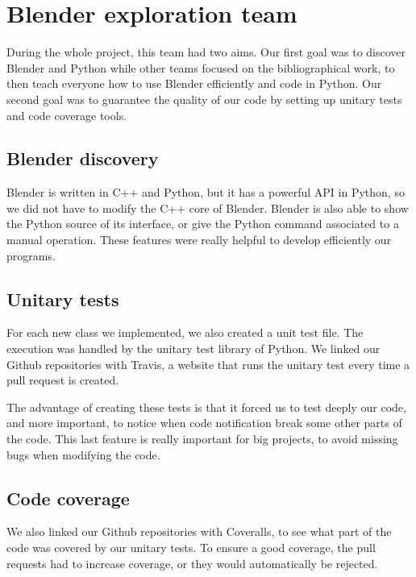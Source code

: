 \section{Blender exploration team}

During the whole project, this team had two aims. Our first goal was
to discover Blender and Python while other teams focused on the
bibliographical work, to then teach everyone how to use Blender
efficiently and code in Python. Our second goal was to guarantee the
quality of our code by setting up unitary tests and code coverage
tools.

\subsection{Blender discovery}

Blender is written in C++ and Python, but it has a powerful API in
Python, so we did not have to modify the C++ core of Blender. Blender
is also able to show the Python source of its interface, or give the
Python command associated to a manual operation. These features were
really helpful to develop efficiently our programs.


\subsection{Unitary tests}

For each new class we implemented, we also created a unit test
file. The execution was handled by the unitary test library of
Python. We linked our Github repositories with Travis, a website
that runs the unitary test every time a pull request is created.

The advantage of creating these tests is that it forced us to test deeply our code, and more important, to notice when code notification break some other parts of the code. This last feature is really important for big projects, to avoid missing bugs when modifying the code.

\subsection{Code coverage}

We also linked our Github repositories with Coveralls, to see what
part of the code was covered by our unitary tests. To ensure a good
coverage, the pull requests had to increase coverage, or they would
automatically be rejected.

